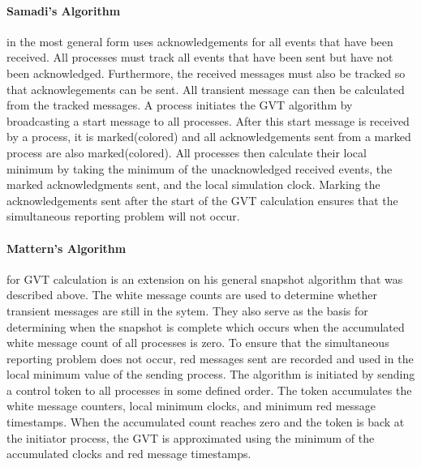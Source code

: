 \documentclass[11pt]{book}
\begin{document}
\paragraph{Samadi's Algorithm}\cite{samadi-85} in the most general form uses acknowledgements for
all events that have been received.  All processes must track all events that have been sent but
have not been acknowledged.  Furthermore, the received messages must also be tracked so that
acknowlegements can be sent.  All transient message can then be calculated from the tracked
messages.  A process initiates the GVT algorithm by broadcasting a start message to all processes.
After this start message is received by a process, it is marked(colored) and all acknowledgements
sent from a marked process are also marked(colored).  All processes then calculate their local
minimum by taking the minimum of the unacknowledged received events, the marked acknowledgments
sent, and the local simulation clock.  Marking the acknowledgements sent after the start of the GVT
calculation ensures that the simultaneous reporting problem will not occur.

\paragraph{Mattern's Algorithm} \cite{mattern-93} for GVT calculation is an extension on his general
snapshot algorithm that was described above.  The white message counts are used to determine whether
transient messages are still in the sytem.  They also serve as the basis for determining when the
snapshot is complete which occurs when the accumulated white message count of all processes is zero.
To ensure that the simultaneous reporting problem does not occur, red messages sent are recorded and
used in the local minimum value of the sending process.  The algorithm is initiated by sending a
control token to all processes in some defined order.  The token accumulates the white message
counters, local minimum clocks, and minimum red message timestamps.  When the accumulated count
reaches zero and the token is back at the initiator process, the GVT is approximated using the
minimum of the accumulated clocks and red message timestamps.

\end{document}

